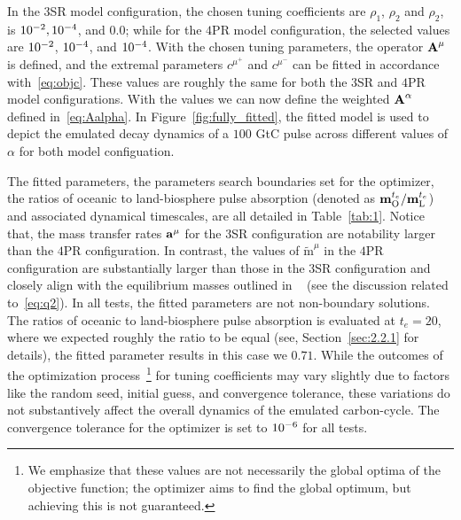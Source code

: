 \documentclass[11pt, a4paper, pdftex, twoside, dvipsnames]{article}
\renewcommand{\ref}{\cref}
\newcommand{\bb}[1]{\boldsymbol{\bold{#1}}}
\newcommand{\bbt}[1]{\tilde{\boldsymbol{\mathrm{#1}}}}
\newcommand{\expnum}[2]{
\ifnum#1=1 
  10^{#2} 
\else 
  #1 \! \cdot \! 10^{#2}
\fi
}
\begin{document}
In the $3$SR model configuration, the chosen tuning coefficients are $\rho_1$, $\rho_2$ and $\rho_2$, is $ \expnum{1}{-2},\expnum{1}{-4}$, and $0.0$; while for the $4$PR model configuration, the selected values are $\expnum{1}{-2}$, $\expnum{1}{-4}$, and $\expnum{1}{-4}$.
%
With the chosen tuning parameters, the operator $\bb{A}^\mu$ is defined, and the extremal parameters $c^{\mu^+}$ and $c^{\mu^-}$ can be fitted in accordance with~\eqref{eq:objc}.
%
These values are roughly the same for both the $3$SR and $4$PR model configurations.  
%
With the values we can now define the weighted $\bb{A}^\alpha$ defined in~\eqref{eq:Aalpha}.
%
In Figure~\ref{fig:fully_fitted}, the fitted model is used to depict the emulated decay dynamics of a $100$ GtC pulse across different values of $\alpha$ for both model configuation.

The fitted parameters, the parameters search boundaries set for the optimizer, the ratios of oceanic to land-biosphere pulse absorption (denoted as $\bb{m}_{\text{O}}^{t_e}/\bb{m}_{\text{L}}^{t_e}$) and associated dynamical timescales, are all detailed in Table~\ref{tab:1}.
%
Notice that, the mass transfer rates $\bb{a}^\mu$ for the $3$SR configuration are notability larger than the $4$PR configuration.
%
In contrast, the values of $\bbt{m}^\mu$ in the $4$PR configuration are substantially larger than those in the $3$SR configuration and closely align with the equilibrium masses outlined in ~\cite{IPCC_carbon_cycle} (see the discussion related to~\eqref{eq:q2}).
In all tests, the fitted parameters are not non-boundary solutions.
The ratios of oceanic to land-biosphere pulse absorption is evaluated at $t_e=20$, where we expected roughly the ratio to be equal (see, Section~\ref{sec:2.2.1} for details), the fitted parameter results in this case we $0.71$.
%
While the outcomes of the optimization process~\footnote{We emphasize that these values are not necessarily the global optima of the objective function; the optimizer aims to find the global optimum, but achieving this is not guaranteed.} for tuning coefficients may vary slightly due to factors like the random seed, initial guess, and convergence tolerance, these variations do not substantively affect the overall dynamics of the emulated carbon-cycle.
%
The convergence tolerance for the optimizer is set to $\expnum{1}{-6}$ for all tests.
%
\end{document}
